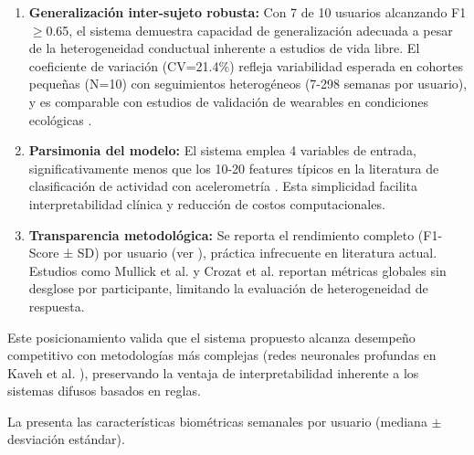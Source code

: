 \begin{enumerate}
    \item \textbf{Generalización inter-sujeto robusta:} Con 7 de 10 usuarios alcanzando F1$\geq$0.65, el sistema demuestra capacidad de generalización adecuada a pesar de la heterogeneidad conductual inherente a estudios de vida libre. El coeficiente de variación (CV=21.4\%) refleja variabilidad esperada en cohortes pequeñas (N=10) con seguimientos heterogéneos (7-298 semanas por usuario), y es comparable con estudios de validación de wearables en condiciones ecológicas \cite{Doherty2021}.
    
    \item \textbf{Parsimonia del modelo:} El sistema emplea 4 variables de entrada, significativamente menos que los 10-20 features típicos en la literatura de clasificación de actividad con acelerometría \cite{Alinia2020}. Esta simplicidad facilita interpretabilidad clínica y reducción de costos computacionales.
    
    \item \textbf{Transparencia metodológica:} Se reporta el rendimiento completo (F1-Score ± SD) por usuario (ver ), práctica infrecuente en literatura actual. Estudios como Mullick et al. \cite{Mullick2022} y Crozat et al. \cite{Crozat2025} reportan métricas globales sin desglose por participante, limitando la evaluación de heterogeneidad de respuesta.
\end{enumerate}

Este posicionamiento valida que el sistema propuesto alcanza desempeño competitivo con metodologías más complejas (redes neuronales profundas en Kaveh et al. \cite{Kaveh2024}), preservando la ventaja de interpretabilidad inherente a los sistemas difusos basados en reglas.

La  presenta las características biométricas semanales por usuario (mediana $\pm$ desviación estándar).

